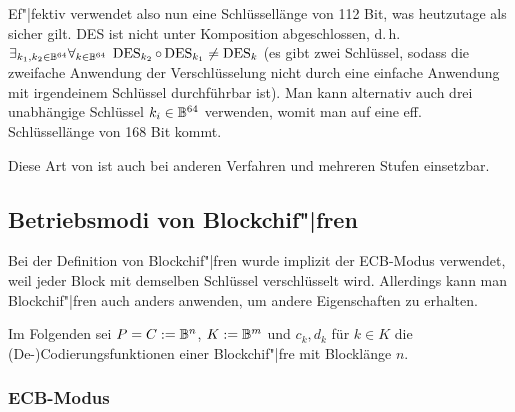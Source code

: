 Ef"|fektiv verwendet also nun eine Schlüssellänge von 112 Bit, was heutzutage als sicher gilt.
DES ist nicht unter Komposition abgeschlossen, d.\,h.
$\exists_{k_1, k_2 \in \mathbb{B}^{64}} \forall_{k \in \mathbb{B}^{64}}\;
\operatorname{DES}_{k_2} \circ \operatorname{DES}_{k_1} \not= \operatorname{DES}_k$
(es gibt zwei Schlüssel, sodass die zweifache Anwendung der Verschlüsselung nicht durch
eine einfache Anwendung mit irgendeinem Schlüssel durchführbar ist).
Man kann alternativ auch drei unabhängige Schlüssel $k_i \in \mathbb{B}^{64}$ verwenden, womit man auf
eine eff. Schlüssellänge von 168 Bit kommt.

Diese Art von  ist auch bei anderen Verfahren und mehreren
Stufen einsetzbar.

\subsection{%
    Betriebsmodi von Blockchif"|fren%
}

Bei der Definition von Blockchif"|fren wurde implizit der ECB-Modus verwendet,
weil jeder Block mit demselben Schlüssel verschlüsselt wird.
Allerdings kann man Blockchif"|fren auch anders anwenden, um andere Eigenschaften zu erhalten.

Im Folgenden sei $P = C := \mathbb{B}^n$, $K := \mathbb{B}^m$ und
$c_k, d_k$ für $k \in K$ die (De-)Codierungsfunktionen einer Blockchif"|fre mit Blocklänge $n$.

\subsubsection{%
    ECB-Modus%
}

